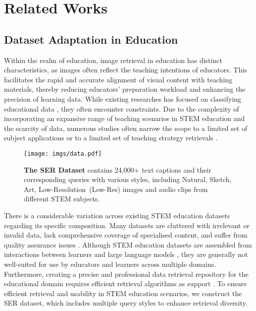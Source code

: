 

\section{Related Works}
\label{sec:related_work}

\subsection{Dataset Adaptation in Education}
Within the realm of education, image retrieval in education has distinct characteristics, as images often reflect the teaching intentions of educators. This facilitates the rapid and accurate alignment of visual content with teaching materials, thereby reducing educators' preparation workload and enhancing the precision of learning data. While existing researches has focused on classifying educational data \cite{choi2020ednet}, they often encounter constraints. Due to the complexity of incorporating an expansive range of teaching scenarios in STEM education and the scarcity of data, numerous studies often narrow the scope to a limited set of subject applications \cite{hendrycks2021measuring,pal2022medmcqa} or to a limited set of teaching strategy retrievals \cite{kwon2024biped,welbl2017crowdsourcing}.

\begin{figure*}[!t]
    \centering
    \texttt{[image: imgs/data.pdf]}
    \vspace{-7mm}
    \caption{\textbf{The SER Dataset} contains 24,000+ text captions and their corresponding queries with various styles, including Natural, Sketch, Art, Low-Resolution~(Low-Res) images and audio clips from different STEM subjects.}
    \vspace{-5mm}
    \label{fig:data_sample}
\end{figure*}


There is a considerable variation across existing STEM education datasets regarding its specific composition. Many datasets are cluttered with irrelevant or invalid data, lack comprehensive coverage of specialised content, and suffer from quality assurance issues \cite{patrinos2018global}. 
Although STEM education datasets are assembled from interactions between learners and large language models \cite{hou2024eval, wang2024large}, they are generally not well-suited for use by educators and learners across multiple domains. Furthermore, creating a precise and professional data retrieval repository for the educational domain requires efficient retrieval algorithms as support \cite{alzoubi2024enhancing}. To ensure efficient retrieval and usability in STEM education scenarios, we construct the SER dataset, which includes multiple query styles to enhance retrieval diversity.

